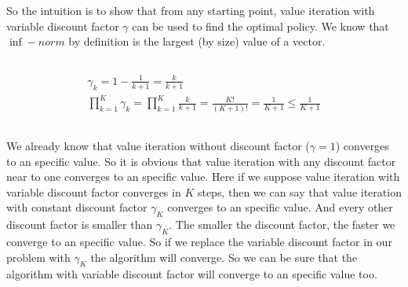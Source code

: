 \documentclass[en]{university}
\begin{document}
\setupdocument

\section{}
\subsection{}
So the intuition is to show that from any starting point, value iteration with variable discount factor $\gamma$ can be used to find the optimal policy.
We know that $\inf-norm$ by definition is the largest (by size) value of a vector.


\subsection{}
\begin{gather*}
    \gamma_k = 1 - \frac{1}{k+1} = \frac{k}{k+1} \\
    \prod_{k=1}^{K} \gamma_k = \prod_{k=1}^{K} \frac{k}{k+1} = \frac{K!}{(K+1)!} = \frac{1}{K+1} \leq \frac{1}{K+1}
\end{gather*}

\subsection{}
We already know that value iteration without discount factor ($\gamma = 1$) converges to an specific value.
So it is obvious that value iteration with any discount factor near to one converges to an specific value.
Here if we suppose value iteration with variable discount factor converges in $K$ steps, then we can say that 
value iteration with constant discount factor $\gamma_K$ converges to an specific value. And every other discount factor 
is smaller than $\gamma_K$. The smaller the discount factor, the faster we converge to an specific value. So if we 
replace the variable discount factor in our problem with $\gamma_K$ the algorithm will converge. So we can be sure that the 
algorithm with variable discount factor will converge to an specific value too.
\end{document}
